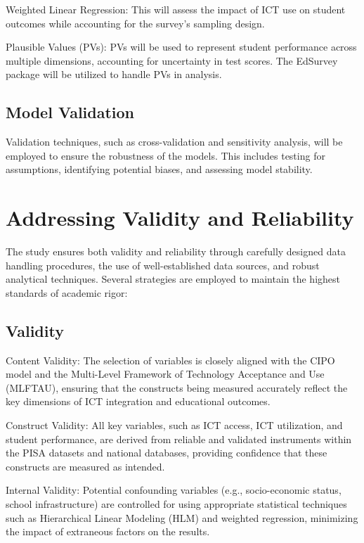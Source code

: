 \documentclass[
]{article}
\begin{document}
Weighted Linear Regression: This will assess the impact of ICT use on
student outcomes while accounting for the survey's sampling design.

Plausible Values (PVs): PVs will be used to represent student
performance across multiple dimensions, accounting for uncertainty in
test scores. The EdSurvey package will be utilized to handle PVs in
analysis.

\hypertarget{model-validation}{%
\subsection{Model Validation}\label{model-validation}}

Validation techniques, such as cross-validation and sensitivity
analysis, will be employed to ensure the robustness of the models. This
includes testing for assumptions, identifying potential biases, and
assessing model stability.

\hypertarget{addressing-validity-and-reliability}{%
\section{Addressing Validity and
Reliability}\label{addressing-validity-and-reliability}}

The study ensures both validity and reliability through carefully
designed data handling procedures, the use of well-established data
sources, and robust analytical techniques. Several strategies are
employed to maintain the highest standards of academic rigor:

\hypertarget{validity}{%
\subsection{Validity}\label{validity}}

Content Validity: The selection of variables is closely aligned with the
CIPO model and the Multi-Level Framework of Technology Acceptance and
Use (MLFTAU), ensuring that the constructs being measured accurately
reflect the key dimensions of ICT integration and educational outcomes.

Construct Validity: All key variables, such as ICT access, ICT
utilization, and student performance, are derived from reliable and
validated instruments within the PISA datasets and national databases,
providing confidence that these constructs are measured as intended.

Internal Validity: Potential confounding variables (e.g., socio-economic
status, school infrastructure) are controlled for using appropriate
statistical techniques such as Hierarchical Linear Modeling (HLM) and
weighted regression, minimizing the impact of extraneous factors on the
results.
\end{document}
